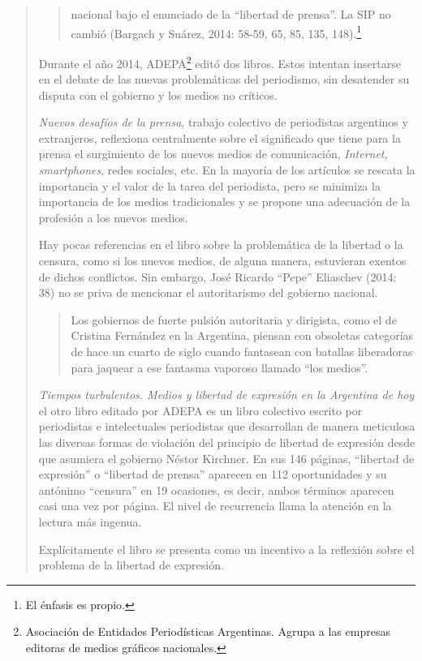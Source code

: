 \begin{quote}
\begin{quote}
nacional bajo el enunciado de la \enquote{libertad de prensa}. La SIP no cambió (Bargach y Suárez, 2014: 58-59, 65, 85, 135, 148).\footnote{El énfasis es propio.}
\end{quote}


Durante el año 2014, ADEPA\footnote{Asociación de Entidades Periodísticas Argentinas. Agrupa a las empresas editoras de medios gráficos nacionales.} editó dos libros. Estos intentan insertarse en el debate de las nuevas problemáticas del periodismo, sin desatender su disputa con el gobierno y los medios no críticos.

\emph{Nuevos desafíos de la prensa}, trabajo colectivo de periodistas argentinos y extranjeros, reflexiona centralmente sobre el significado que tiene para la prensa el surgimiento de los nuevos medios de comunicación, \emph{Internet, smartphones}, redes sociales, etc. En la mayoría de los artículos se rescata la importancia y el valor de la tarea del periodista, pero se minimiza la importancia de los medios tradicionales y se propone una adecuación de la profesión a los nuevos medios.

Hay pocas referencias en el libro sobre la problemática de la libertad o la censura, como si los nuevos medios, de alguna manera, estuvieran exentos de dichos conflictos. Sin embargo, José Ricardo \enquote{Pepe} Eliaschev (2014: 38) no se priva de mencionar el autoritarismo del gobierno nacional.

\begin{quote}
	Los gobiernos de fuerte pulsión autoritaria y dirigista, como el de Cristina Fernández en la Argentina, piensan con obsoletas categorías de hace un cuarto de siglo cuando fantasean con batallas liberadoras para jaquear a ese fantasma vaporoso llamado \enquote{los medios}.
\end{quote}


\emph{Tiempos turbulentos. Medios y libertad de expresión en la Argentina de hoy} el otro libro editado por ADEPA es un libro colectivo escrito por periodistas e intelectuales periodistas que desarrollan de manera meticulosa las diversas formas de violación del principio de libertad de expresión desde que asumiera el gobierno Néstor Kirchner. En sus 146 páginas, \enquote{libertad de expresión} o \enquote{libertad de prensa} aparecen en 112 oportunidades y su antónimo \enquote{censura} en 19 ocasiones, es decir, ambos términos aparecen casi una vez por página. El nivel de recurrencia llama la atención en la lectura más ingenua.

Explícitamente el libro se presenta como un incentivo a la reflexión sobre el problema de la libertad de expresión.


\end{quote}
